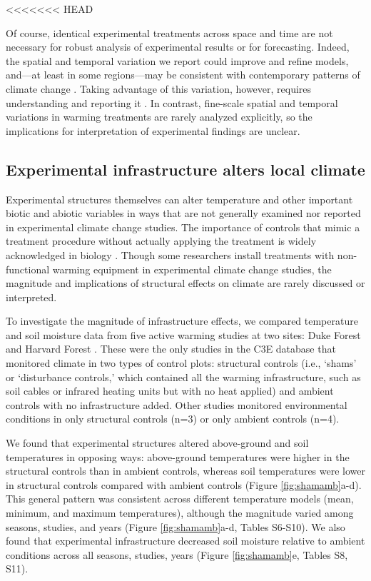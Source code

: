 \documentclass{article}
\begin{document}
<<<<<<< HEAD
\par Of course, identical experimental treatments across space and time are not necessary for robust analysis of experimental results or for forecasting. Indeed, the spatial and temporal variation we report could improve and refine models, and---at least in some regions---may be consistent with contemporary patterns of climate change \citep{ipcc2013}. Taking advantage of this variation, however, requires understanding and reporting it \citep[e.g.,][]{milcu2016}. In contrast, fine-scale spatial and temporal variations in warming treatments are rarely analyzed explicitly, so the implications for interpretation of experimental findings are unclear.

\subsection* {Experimental infrastructure alters local climate}
Experimental structures themselves can alter temperature and other important biotic and abiotic variables in ways that are not generally examined nor reported in experimental climate change studies. The importance of controls that mimic a treatment procedure without actually applying the treatment is widely acknowledged in biology \citep[e.g.,][]{spector2001,johnson2002,quinn2002}. Though some researchers install treatments with non-functional warming equipment in experimental climate change studies, the magnitude and implications of structural effects on climate are rarely discussed or interpreted.
\par To investigate the magnitude of infrastructure effects, we compared temperature and soil moisture data from five active warming studies at two sites: Duke Forest and Harvard Forest \citep{farnsworth1995,clark2014b, marchin2015, pelini2011}. These were the only studies in the C3E database that monitored climate in two types of control plots: structural controls (i.e., `shams' or `disturbance controls,' which contained all the warming infrastructure, such as soil cables or infrared heating units but with no heat applied) and ambient controls with no infrastructure added. Other studies monitored environmental conditions in only structural controls (n=3) or only ambient controls (n=4).

\par We found that experimental structures altered above-ground and soil temperatures in opposing ways: above-ground temperatures were higher in the structural controls than in ambient controls, whereas soil temperatures were lower in structural controls compared with ambient controls (Figure \ref{fig:shamamb}a-d). This general pattern was consistent across different temperature models (mean, minimum, and maximum temperatures), although the magnitude varied among seasons, studies, and years (Figure \ref{fig:shamamb}a-d, Tables S6-S10). We also found that experimental infrastructure decreased soil moisture relative to ambient conditions across all seasons, studies, years (Figure \ref{fig:shamamb}e, Tables S8, S11). 
\end{document}
